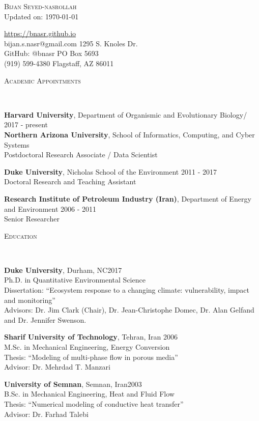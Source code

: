 \documentclass[10pt]{article}
\makeatletter
\newenvironment{changemargin}[2]{%
  \begin{list}{}{%
 \setlength{\topsep}{0pt}%
 \setlength{\leftmargin}{#1}%
 \setlength{\rightmargin}{#2}%
 \setlength{\listparindent}{\parindent}%
 \setlength{\itemindent}{\parindent}%
 \setlength{\parsep}{\parskip}%
  }%
  \item[]}{\end{list}
}
\newcommand{\lineover}{
  \begin{changemargin}{-0.05in}{-0.05in}
  \vspace*{-8pt}
  \hrulefill \\
  \vspace*{-2pt}
  \end{changemargin}
}
\newcommand{\header}[1]{
  \begin{changemargin}{-0.5in}{-0.5in}
  \scshape{#1}\\
  \lineover
  \end{changemargin}
}
\newcommand{\contact}[9]{
  \begin{changemargin}{-0.5in}{-0.5in}
  \begin{flushleft}
  
  {\huge \scshape {#1}}\\ 
  
  \bigskip
  {Updated on: #2}\medskip
  
  \url{#3} \\
  {#4} \hfill{#5}\\
  GitHub: @{#6} \hfill{#7}\\
  {#8} \hfill{#9}\\
  
  \end{flushleft}
  \medskip
  \end{changemargin}
}
\newenvironment{body} {
  \vspace*{-2pt}
  \begin{changemargin}{-0.5in}{-0.5in}
}
{\end{changemargin}
}
\makeatother
\begin{document}
\contact{Bijan Seyed-nasrollah}{\today}
{https://bnasr.github.io}
{bijan.s.nasr@gmail.com}{1295 S. Knoles Dr.}
{bnasr}{PO Box 5693}
{(919) 599-4380}{Flagstaff, AZ 86011}



\medskip
\medskip

\newcommand{\thedate}{\today}
\header{Academic Appointments}

\begin{body}

  \textbf{Harvard University}, Department of Organismic and Evolutionary Biology/  \hfill {2017 - present}\\
  \textbf{Northern Arizona University}, School of Informatics, Computing, and Cyber Systems\\
  Postdoctoral Research Associate / Data Scientist
  \medskip

  \textbf{Duke University}, Nicholas School of the Environment \hfill {2011 - 2017}\\
  Doctoral Research and Teaching Assistant
  \medskip

  \textbf{Research Institute of Petroleum Industry (Iran)}, Department of Energy and Environment \hfill {2006 - 2011}\\
  Senior Researcher
  \medskip

\end{body}
\medskip

\header{Education}

\begin{body}

  \textbf{Duke University}, Durham, NC\hfill {2017} \\
  {Ph.D. in Quantitative Environmental Science}\\
  Dissertation: ``Ecosystem response to a changing climate: vulnerability, impact and monitoring''\\
  Advisors: Dr. Jim Clark (Chair), Dr. Jean-Christophe Domec, Dr. Alan Gelfand and Dr. Jennifer Swenson. \\
  \medskip

  \textbf{Sharif University of Technology}, Tehran, Iran \hfill {2006} \\
  M.Sc. in Mechanical Engineering, Energy Conversion\\
  Thesis: ``Modeling of multi-phase flow in porous media''\\
  Advisor: Dr. Mehrdad T. Manzari\\
  \medskip

  \textbf{University of Semnan}, Semnan, Iran\hfill {2003} \\
  {B.Sc. in Mechanical Engineering, Heat and Fluid Flow} \\
  Thesis: ``Numerical modeling of conductive heat transfer''\\
  Advisor: Dr. Farhad Talebi\\
  \medskip

\end{body}
\end{document}
